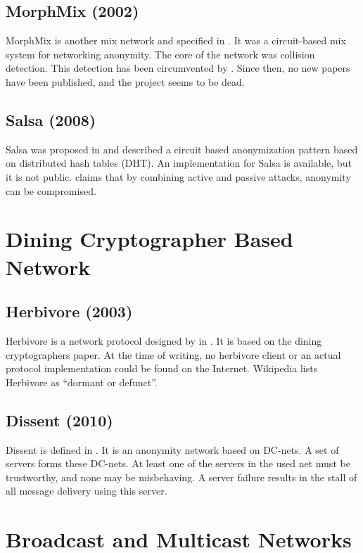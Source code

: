 \subsection{MorphMix (2002)}
MorphMix is another mix network and specified in \cite{morphmix:wpes2002}. It was a circuit-based mix system for networking anonymity. The core of the network was collision detection. This detection has been circumvented by \cite{morphmix:pet2006}. Since then, no new papers have been published, and the project seems to be dead.

\subsection{Salsa (2008)}
Salsa was proposed in \cite{Salsa} and described a circuit based anonymization pattern based on distributed hash tables (DHT). An implementation for Salsa is available, but it is not public. \cite{ccs2008:mittal} claims that by combining active and passive attacks, anonymity can be compromised.

\section{Dining Cryptographer Based Network}
\subsection{Herbivore (2003)}
Herbivore is a network protocol designed by \citeauthor{herbivore:tr} in \cite{herbivore:tr}. It is based on the dining cryptographers paper\cite{chaum-dc}. At the time of writing, no herbivore client or an actual protocol implementation could be found on the Internet. Wikipedia lists Herbivore as ``dormant or defunct''.

\subsection{Dissent (2010)}
Dissent is defined in \cite{Corrigan-Gibbs:2010:DAA:1866307.1866346}. It is an anonymity network based on DC-nets. A set of servers forms these DC-nets. At least one of the servers in the used net must be trustworthy, and none may be misbehaving. A server failure results in the stall of all message delivery using this server.

\section{Broadcast and Multicast Networks}
